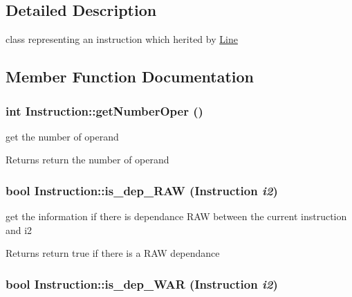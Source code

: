 \subsection{Detailed Description}
class representing an instruction which herited by \hyperlink{classLine}{Line} 

\subsection{Member Function Documentation}
\hypertarget{classInstruction_a3278668f293095ccb1565f36894a117e}{
\subsubsection[{getNumberOper}]{\setlength{\rightskip}{0pt plus 5cm}int Instruction::getNumberOper ()}}
\label{classInstruction_a3278668f293095ccb1565f36894a117e}


get the number of operand \begin{DoxyReturn}{Returns}
return the number of operand 
\end{DoxyReturn}
\hypertarget{classInstruction_a757d13233614f3b81f340275e0ac03fc}{
\subsubsection[{is\_\-dep\_\-RAW}]{\setlength{\rightskip}{0pt plus 5cm}bool Instruction::is\_\-dep\_\-RAW ({\bf Instruction} {\em i2})}}
\label{classInstruction_a757d13233614f3b81f340275e0ac03fc}


get the information if there is dependance RAW between the current instruction and i2 \begin{DoxyReturn}{Returns}
return true if there is a RAW dependance 
\end{DoxyReturn}
\hypertarget{classInstruction_a22c2bbac305649d7f0ec17a04ef217fc}{
\subsubsection[{is\_\-dep\_\-WAR}]{\setlength{\rightskip}{0pt plus 5cm}bool Instruction::is\_\-dep\_\-WAR ({\bf Instruction} {\em i2})}}
\label{classInstruction_a22c2bbac305649d7f0ec17a04ef217fc}


